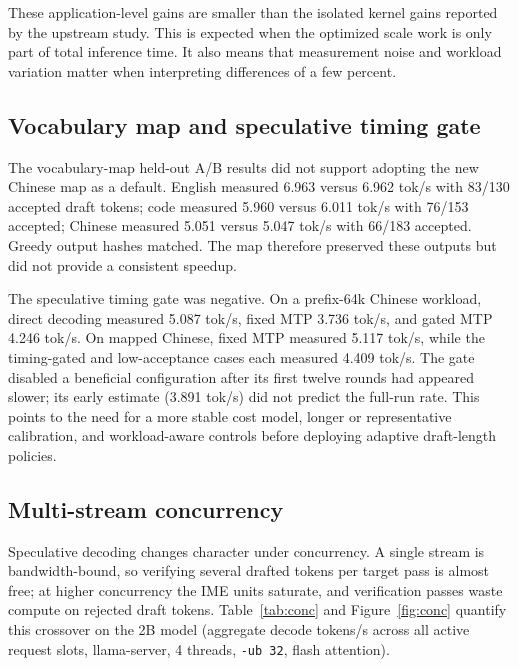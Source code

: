 \documentclass[10pt,twocolumn]{article}
\begin{document}
These application-level gains are smaller than the isolated kernel gains reported by the upstream study. This is expected when the optimized scale work is only part of total inference time. It also means that measurement noise and workload variation matter when interpreting differences of a few percent.

\subsection{Vocabulary map and speculative timing gate}
The vocabulary-map held-out A/B results did not support adopting the new Chinese map as a default. English measured 6.963 versus 6.962 tok/s with 83/130 accepted draft tokens; code measured 5.960 versus 6.011 tok/s with 76/153 accepted; Chinese measured 5.051 versus 5.047 tok/s with 66/183 accepted. Greedy output hashes matched. The map therefore preserved these outputs but did not provide a consistent speedup.

The speculative timing gate was negative. On a prefix-64k Chinese workload, direct decoding measured 5.087 tok/s, fixed MTP 3.736 tok/s, and gated MTP 4.246 tok/s. On mapped Chinese, fixed MTP measured 5.117 tok/s, while the timing-gated and low-acceptance cases each measured 4.409 tok/s. The gate disabled a beneficial configuration after its first twelve rounds had appeared slower; its early estimate (3.891 tok/s) did not predict the full-run rate. This points to the need for a more stable cost model, longer or representative calibration, and workload-aware controls before deploying adaptive draft-length policies.

\subsection{Multi-stream concurrency}
Speculative decoding changes character under concurrency. A single stream is bandwidth-bound, so verifying several drafted tokens per target pass is almost free; at higher concurrency the IME units saturate, and verification passes waste compute on rejected draft tokens. Table~\ref{tab:conc} and Figure~\ref{fig:conc} quantify this crossover on the 2B model (aggregate decode tokens/s across all active request slots, llama-server, 4 threads, \texttt{-ub 32}, flash attention).
\end{document}

